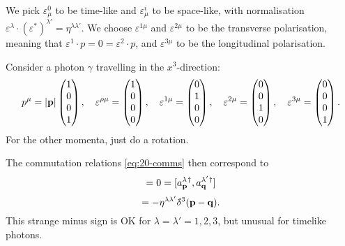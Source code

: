 We pick $\varepsilon^0_{\mu}$  to be time-like and $\varepsilon^{i}_{\mu}$  to be space-like, with normalisation $ \varepsilon^\lambda \cdot (\varepsilon^*)^{\lambda'} = \eta^{\lambda \lambda'}$.
We choose $\varepsilon^{1\mu}$  and $\varepsilon^{2 \mu}$  to be the transverse polarisation, meaning that $\varepsilon^1 \cdot p = 0 = \varepsilon^2 \cdot p$, and $\varepsilon^{3 \mu}$ to be the longitudinal polarisation.
\begin{example}[]
  Consider a photon $\gamma$ travelling in the $x^3$-direction:
  \begin{equation}
    p^\mu = \abs{\vb{p}} 
    \begin{pmatrix}
    1 \\
    0 \\
    0 \\
    1 \\
    \end{pmatrix}
    , \quad \varepsilon^{\rho\mu} = 
    \begin{pmatrix}
    1 \\
    0 \\
    0 \\
    0 \\
    \end{pmatrix}, \quad \varepsilon^{1\mu} = 
    \begin{pmatrix}
    0 \\
    1 \\
    0 \\
    0 \\
    \end{pmatrix}, \quad \varepsilon^{2\mu} = 
    \begin{pmatrix}
    0 \\
    0 \\
    1 \\
    0 \\
    \end{pmatrix}, \quad \varepsilon^{3\mu} = 
    \begin{pmatrix}
    0 \\
    0 \\
    0 \\
    1 \\
    \end{pmatrix}.
  \end{equation}
  For the other momenta, just do a rotation.
\end{example}

The commutation relations \eqref{eq:20-comms} then correspond to 
\begin{equation}
  [a_{\vb{p}}^{\lambda}, a_{\vb{q}}^{\lambda'}] = 0  = [a_{\vb{p}}^\lambda{}^{\dagger}, a_{\vb{q}}^{\lambda'}{}^{\dagger}]
\end{equation}
\begin{equation}
  [a_{\vb{p}}^{\lambda}, a_{\vb{q}}^{\lambda'}{}^{\dagger}] = - \eta^{\lambda \lambda'} \bdelta^3(\vb{p} - \vb{q}).
\end{equation}
This strange minus sign is OK for $\lambda = \lambda' = 1 , 2, 3$, but unusual for timelike photons.

